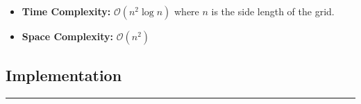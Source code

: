 \begin{itemize}
    \item \textbf{Time Complexity:} $\mathcal{O}(n^2 \log n)$ where $n$ is the side length of the grid.
    \item \textbf{Space Complexity:} $\mathcal{O}(n^2)$
\end{itemize}

\subsection*{Implementation} 
\vspace{-1.5em}
\noindent\rule{\textwidth}{0.4pt}
